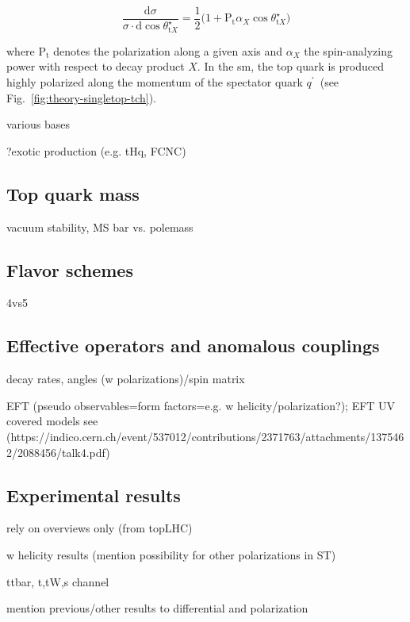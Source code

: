 \begin{equation}
\frac{\mathrm{d}\sigma}{\sigma\cdot\mathrm{d}\cos\theta^\star_{\mathrm{t}X}}=\frac{1}{2}\big(1+\mathrm{P}_\mathrm{t}\alpha_{X}\cos\theta^\star_{\mathrm{t}X}\big)
\end{equation}

where $\mathrm{P}_\mathrm{t}$ denotes the polarization along a given axis and $\alpha_{X}$ the spin-analyzing power with respect to decay product $X$. In the \gls{sm}, the top quark is produced highly polarized along the momentum of the spectator quark ${q^\prime}$~(see Fig.~\ref{fig:theory-singletop-tch}).

various bases

?exotic production (e.g. tHq, FCNC)

\subsection{Top quark mass}

vacuum stability, MS bar vs. polemass

\subsection{Flavor schemes}

4vs5

\subsection{Effective operators and anomalous couplings}

decay rates, angles (w polarizations)/spin matrix

EFT (pseudo observables=form factors=e.g. w helicity/polarization?); EFT UV covered models see (https://indico.cern.ch/event/537012/contributions/2371763/attachments/1375462/2088456/talk4.pdf)


\subsection{Experimental results}
\label{sec:theory-exp-results}

rely on overviews only (from topLHC)

w helicity results (mention possibility for other polarizations in ST)

ttbar, t,tW,s channel

mention previous/other results to differential and polarization
